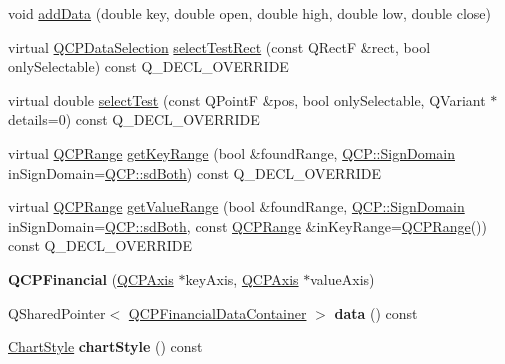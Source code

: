 \begin{DoxyCompactItemize}
\item 
void \hyperlink{class_q_c_p_financial_a688bbd052e00a02954ddb0068b378170}{add\+Data} (double key, double open, double high, double low, double close)
\item 
virtual \hyperlink{class_q_c_p_data_selection}{Q\+C\+P\+Data\+Selection} \hyperlink{class_q_c_p_financial_a3c5beb1ab028a1dba845fc9dcffc7cf4}{select\+Test\+Rect} (const Q\+RectF \&rect, bool only\+Selectable) const Q\+\_\+\+D\+E\+C\+L\+\_\+\+O\+V\+E\+R\+R\+I\+DE
\item 
virtual double \hyperlink{class_q_c_p_financial_aac8e91622ac58330fa9ce81cc8fd40ee}{select\+Test} (const Q\+PointF \&pos, bool only\+Selectable, Q\+Variant $\ast$details=0) const Q\+\_\+\+D\+E\+C\+L\+\_\+\+O\+V\+E\+R\+R\+I\+DE
\item 
virtual \hyperlink{class_q_c_p_range}{Q\+C\+P\+Range} \hyperlink{class_q_c_p_financial_a15d68fb257113fef697356d65fa76559}{get\+Key\+Range} (bool \&found\+Range, \hyperlink{namespace_q_c_p_afd50e7cf431af385614987d8553ff8a9}{Q\+C\+P\+::\+Sign\+Domain} in\+Sign\+Domain=\hyperlink{namespace_q_c_p_afd50e7cf431af385614987d8553ff8a9a3dee7e9cd2fedce9253b83e172626a6c}{Q\+C\+P\+::sd\+Both}) const Q\+\_\+\+D\+E\+C\+L\+\_\+\+O\+V\+E\+R\+R\+I\+DE
\item 
virtual \hyperlink{class_q_c_p_range}{Q\+C\+P\+Range} \hyperlink{class_q_c_p_financial_a82d862aa134d78853f98f8c57a03415b}{get\+Value\+Range} (bool \&found\+Range, \hyperlink{namespace_q_c_p_afd50e7cf431af385614987d8553ff8a9}{Q\+C\+P\+::\+Sign\+Domain} in\+Sign\+Domain=\hyperlink{namespace_q_c_p_afd50e7cf431af385614987d8553ff8a9a3dee7e9cd2fedce9253b83e172626a6c}{Q\+C\+P\+::sd\+Both}, const \hyperlink{class_q_c_p_range}{Q\+C\+P\+Range} \&in\+Key\+Range=\hyperlink{class_q_c_p_range}{Q\+C\+P\+Range}()) const Q\+\_\+\+D\+E\+C\+L\+\_\+\+O\+V\+E\+R\+R\+I\+DE
\item 
{\bfseries Q\+C\+P\+Financial} (\hyperlink{class_q_c_p_axis}{Q\+C\+P\+Axis} $\ast$key\+Axis, \hyperlink{class_q_c_p_axis}{Q\+C\+P\+Axis} $\ast$value\+Axis)\hypertarget{class_q_c_p_financial_a4702d5248feeb9d1ec6e3ce725b10b32}{}\label{class_q_c_p_financial_a4702d5248feeb9d1ec6e3ce725b10b32}

\item 
Q\+Shared\+Pointer$<$ \hyperlink{class_q_c_p_data_container}{Q\+C\+P\+Financial\+Data\+Container} $>$ {\bfseries data} () const \hypertarget{class_q_c_p_financial_a7dbf89b84795cba5a437a2a6f529b961}{}\label{class_q_c_p_financial_a7dbf89b84795cba5a437a2a6f529b961}

\item 
\hyperlink{class_q_c_p_financial_a0f800e21ee98d646dfc6f8f89d10ebfb}{Chart\+Style} {\bfseries chart\+Style} () const \hypertarget{class_q_c_p_financial_a0888c9308cc5fcb4daa70184f9582412}{}\label{class_q_c_p_financial_a0888c9308cc5fcb4daa70184f9582412}


\end{DoxyCompactItemize}
